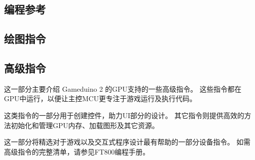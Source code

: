 \documentclass[10pt]{book}
\makeatletter
\newcommand{\gdtwo}{Gameduino 2 }
\newcommand{\mach}[1]{\texttt{\textbf{#1}}}
\newcommand{\cmdidx}[1]{
\index{#1@\mach{#1()}}
}
\newcommand{\cmd}[1]{\cmdidx{cmd\_#1}\nameref{cmd:#1}}
\makeatother
\begin{document}
\begin{CJK}{UTF8}{gkai}
\part{编程参考}

\chapter{绘图指令}

\newcommand{\drawcmd}[2]{
\newpage
\section{\texttt{#1}}
\label{#1}
\index{#1@\mach{#1()}|boldindex}

#2

}

\newcommand{\lightcmd}[3]{
\section{\texttt{#1}}
\label{#2}
\index{#1@\mach{#1()}|boldindex}


}



\chapter{高级指令}

这一部分主要介绍 \gdtwo 的GPU支持的一些高级指令。
这些指令都在GPU中运行，以便让主控MCU更专注于游戏运行及执行代码。

这类指令的一部分用于创建控件，助力UI部分的设计。
其它指令则提供高效的方法初始化和管理GPU内存、加载图形及其它资源。

这一部分将精选对于游戏以及交互式程序设计最有帮助的一部分设备指令。
如需高级指令的完整清单，请参见FT800编程手册。


\end{CJK}
\end{document}
